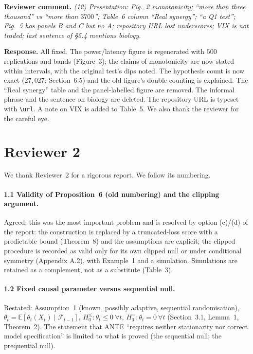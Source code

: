 \documentclass[11pt,a4paper]{article}
\newcommand{\rev}[1]{\par\noindent\textbf{Reviewer comment.} \emph{#1}}
\newcommand{\resp}{\par\noindent\textbf{Response.} }
\begin{document}
\rev{(12) Presentation: Fig.~2 monotonicity; ``more than three thousand'' vs ``more than $3700$''; Table~6 column ``Real synergy''; ``a Q1 test''; Fig.~5 has panels B and C but no A; repository URL lost underscores; VIX is not traded; last sentence of \S5.4 mentions biology.}
\resp All fixed. The power/latency figure is regenerated with $500$ replications and bands (Figure~3); the claims of monotonicity are now stated within intervals, with the original test's dips noted. The hypothesis count is now exact ($27{,}027$; Section~6.5) and the old figure's double counting is explained. The ``Real synergy'' table and the panel-labelled figure are removed. The informal phrase and the sentence on biology are deleted. The repository URL is typeset with \verb|\url|. A note on VIX is added to Table~5. We also thank the reviewer for the careful eye.

\section*{Reviewer 2}

We thank Reviewer~2 for a rigorous report. We follow its numbering.

\paragraph{1.1 Validity of Proposition~6 (old numbering) and the clipping argument.} Agreed; this was the most important problem and is resolved by option (c)/(d) of the report: the construction is replaced by a truncated-loss score with a predictable bound (Theorem~8) and the assumptions are explicit; the clipped procedure is recorded as valid only for its own clipped null or under conditional symmetry (Appendix A.2), with Example~1 and a simulation. Simulations are retained as a complement, not as a substitute (Table~3).

\paragraph{1.2 Fixed causal parameter versus sequential null.} Restated: Assumption~1 (known, possibly adaptive, sequential randomisation), $\theta_t=\mathbb E[\theta_t(X_t)\mid\mathcal F_{t-1}]$, $H_0^{\le}:\theta_t\le0\ \forall t$, $H_0^{=}:\theta_t=0\ \forall t$ (Section~3.1, Lemma~1, Theorem~2). The statement that ANTE ``requires neither stationarity nor correct model specification'' is limited to what is proved (the sequential null; the prequential null).
\end{document}
